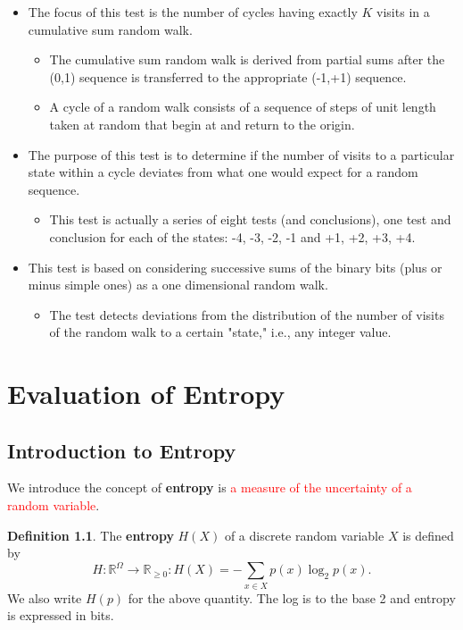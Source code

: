 \documentclass[12pt,openany]{book}
\theoremstyle{definition}
\newtheorem{definition}{Definition}[chapter]
\newcommand{\R}{\mathbb{R}}
\begin{document}
	\begin{itemize}
		\item The focus of this test is the number of cycles having exactly \( K \) visits in a cumulative sum random walk.
		\begin{itemize}
			\item The cumulative sum random walk is derived from partial sums after the (0,1) sequence is transferred to the appropriate (-1,+1) sequence.
			\item A cycle of a random walk consists of a sequence of steps of unit length taken at random that begin at and return to the origin.
		\end{itemize}
		\item The purpose of this test is to determine if the number of visits to a particular state within a cycle deviates from what one would expect for a random sequence.
		\begin{itemize}
			\item This test is actually a series of eight tests (and conclusions), one test and conclusion for each of the states: -4, -3, -2, -1 and +1, +2, +3, +4.
		\end{itemize}
		\item This test is based on considering successive sums of the binary bits (plus or minus simple ones) as a one dimensional random walk.
		\begin{itemize}
			\item The test detects deviations from the distribution of the number of visits of the random walk to a certain "state," i.e., any integer value.
		\end{itemize}
	\end{itemize}

\newpage
\chapter{Evaluation of Entropy}

\section{Introduction to Entropy}

We introduce the concept of \textbf{entropy} is \textcolor{red}{a measure of the uncertainty of a random variable}.
\\
\begin{tcolorbox}[colback=white,colframe=defcolor,arc=5pt,title={\color{white}\bf Entropy}]\begin{definition}
	The \textbf{entropy} \( H(X) \) of a discrete random variable \( X \) is defined by
	\[
	H:\R^{\Omega}\to\R_{\geq 0}:H(X) = -\sum_{x \in X} p(x) \log_2 p(x).
	\]
	We also write \( H(p) \) for the above quantity. The log is to the base 2 and entropy is expressed in bits.
\end{definition}
\end{tcolorbox}
\end{document}
